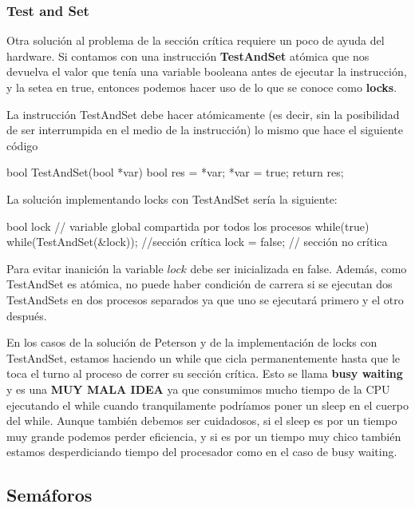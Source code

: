 \documentclass{article}
\begin{document}
\subsubsection{Test and Set}

Otra soluci\'on al problema de la secci\'on cr\'itica requiere un poco de ayuda del hardware. Si contamos con una instrucci\'on \textbf{TestAndSet} at\'omica que nos devuelva el valor que ten\'ia una variable booleana antes de ejecutar la instrucci\'on, y la setea en true, entonces podemos hacer uso de lo que se conoce como \textbf{locks}.

La instrucci\'on TestAndSet debe hacer at\'omicamente (es decir, sin la posibilidad de ser interrumpida en el medio de la instrucci\'on) lo mismo que hace el siguiente c\'odigo

\begin{code}
bool TestAndSet(bool *var)
{
    bool res = *var;
		*var = true;
		return res;
}
\end{code}

La soluci\'on implementando locks con TestAndSet ser\'ia la siguiente:

\begin{code}
bool lock // variable global compartida por todos los procesos
while(true)
{
    while(TestAndSet(&lock));
		//sección crítica
		lock = false;
		// sección no crítica
}
\end{code}

Para evitar inanici\'on la variable $lock$ debe ser inicializada en false. Adem\'as, como TestAndSet es at\'omica, no puede haber condici\'on de carrera si se ejecutan dos TestAndSets en dos procesos separados ya que uno se ejecutar\'a primero y el otro despu\'es.

En los casos de la soluci\'on de Peterson y de la implementaci\'on de locks con TestAndSet, estamos haciendo un while que cicla permanentemente hasta que le toca el turno al proceso de correr su secci\'on cr\'itica. Esto se llama \textbf{busy waiting} y es una \textbf{MUY MALA IDEA} ya que consumimos mucho tiempo de la CPU ejecutando el while cuando tranquilamente podr\'iamos poner un sleep en el cuerpo del while. Aunque tambi\'en debemos ser cuidadosos, si el sleep es por un tiempo muy grande podemos perder eficiencia, y si es por un tiempo muy chico tambi\'en estamos desperdiciando tiempo del procesador como en el caso de busy waiting.

\subsection{Sem\'aforos}
\end{document}
